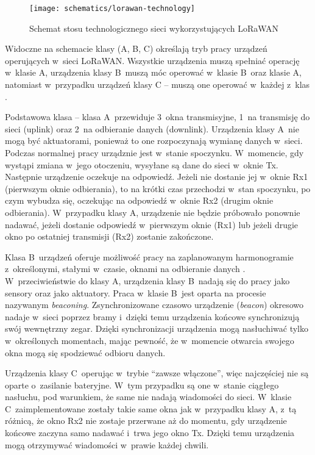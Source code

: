 \begin{figure}[!htbp]
    \centering
    \texttt{[image: schematics/lorawan-technology]}
    \caption{\label{img:lorawan-technology}Schemat stosu technologicznego sieci wykorzystujących LoRaWAN}
\end{figure}

Widoczne na schemacie klasy (A, B, C) określają tryb pracy urządzeń operujących w~sieci LoRaWAN. Wszystkie urządzenia
muszą spełniać operację w~klasie A, urządzenia klasy B~muszą móc operować w~klasie B~oraz klasie A, natomiast
w~przypadku urządzeń klasy C -- muszą one operować w~każdej z~klas \cite{lorawan-device-class,lorawan-classb-eval}.

Podstawowa klasa -- klasa A~przewiduje 3~okna transmisyjne, 1~na transmisję do sieci (uplink) oraz 2~na odbieranie
danych (downlink). Urządzenia klasy A~nie mogą być aktuatorami, ponieważ to one rozpoczynają wymianę danych w~sieci.
Podczas normalnej pracy urządznie jest w~stanie spoczynku. W~momencie, gdy wystąpi zmiana w~jego otoczeniu, wysyłane są
dane do sieci w~oknie Tx. Następnie urządzenie oczekuje na odpowiedź. Jeżeli nie dostanie jej w~oknie Rx1 (pierwszym
oknie odbierania), to na krótki czas przechodzi w~stan spoczynku, po czym wybudza się, oczekując na odpowiedź w~oknie
Rx2 (drugim oknie odbierania). W~przypadku klasy A, urządzenie nie będzie próbowało ponownie nadawać, jeżeli dostanie
odpowiedź w~pierwszym oknie (Rx1) lub jeżeli drugie okno po ostatniej transmisji (Rx2) zostanie zakończone.

Klasa B~urządzeń oferuje możliwość pracy na zaplanowanym harmonogramie z~określonymi, stałymi w~czasie, oknami na
odbieranie danych \cite{lorawan-classb-eval}. W~przeciwieństwie do klasy A, urządzenia klasy B~nadają się do pracy jako
sensory oraz jako aktuatory. Praca w~klasie B~jest oparta na procesie nazywanym \textsl{beaconing}. Zsynchronizowane
czasowo urządzenie (\textsl{beacon}) okresowo nadaje w~sieci poprzez bramy i~dzięki temu urządzenia końcowe
synchronizują swój wewnętrzny zegar. Dzięki synchronizacji urządzenia mogą nasłuchiwać tylko w~określonych momentach,
mając pewność, że w~momencie otwarcia swojego okna mogą się spodziewać odbioru danych.

Urządzenia klasy C~operując w~trybie \enquote{zawsze włączone}, więc najczęściej nie są oparte o~zasilanie bateryjne.
W~tym przypadku są one w~stanie ciągłego nasłuchu, pod warunkiem, że same nie nadają wiadomości do sieci. W~klasie
C~zaimplementowane zostały takie same okna jak w~przypadku klasy A, z~tą różnicą, że okno Rx2 nie zostaje przerwane aż
do momentu, gdy urządzenie końcowe zaczyna samo nadawać i~trwa jego okno Tx. Dzięki temu urządzenia mogą otrzymywać
wiadomości w~prawie każdej chwili.

